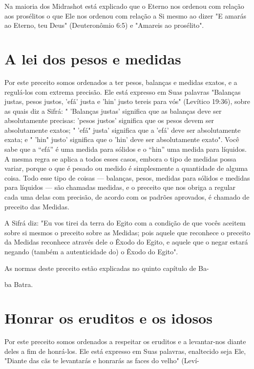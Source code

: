 Na maioria dos Midrashot está explicado que o Eterno nos ordenou com
relação aos prosélitos o que Ele nos ordenou com relação a Si mesmo ao
dizer "E amarás ao Eterno, teu Deus" (Deuteronômio 6:5) e "Amareis ao
prosélito".

\section{A lei dos pesos e medidas}

Por este preceito somos ordenados a ter pesos, balanças e medidas
exatos, e a regulá-los com extrema precisão. Ele está expresso em Suas
palavras "Balanças justas, pesos justos, 'efá' justa e 'hin' justo
tereis para vós" (Levítico 19:36), sobre as quais diz a Sifrá: "
'Balanças justas' significa que as balanças deve ser absolutamente
precisas: 'pesos justos' significa que os pesos devem ser absolutamente
exatos; " 'efá" justa' significa que a 'efá' deve ser absoluta­mente
exata; e " 'hin" justo' significa que o 'hin' deve ser absolutamente
exa­to". Você sabe que a ``efá'' é uma medida para sólidos e o ``hin'' uma
medida para líquidos. A mesma regra se aplica a todos esses casos,
embora o tipo de medidas possa variar, porque o que é pesado ou medido é
simplesmente a quan­tidade de alguma coisa. Todo esse tipo de coisas ---
balanças, pesos, medidas para sólidos e medidas para líquidos --- são
chamadas medidas, e o preceito que nos obriga a regular cada uma delas
com precisão, de acordo com os pa­drões aprovados, é chamado de preceito
das Medidas.

A Sifrá diz: "Eu vos tirei da terra do Egito com a condição de que vocês
aceitem sobre si mesmos o preceito sobre as Medidas; pois aquele que
reconhece o preceito da Medidas reconhece através dele o Êxodo do Egito,
e aquele que o negar estará negando (também a autenticidade do) o Êxodo
do Egito".


As normas deste preceito estão explicadas no quinto capítulo de Ba-


ba Batra.

\section{Honrar os eruditos e os idosos}

Por este preceito somos ordenados a respeitar os eruditos e a
levantar-nos diante deles a fim de honrá-los. Ele está expresso em Suas
palavras, enalte­cido seja Ele, "Diante das cãs te levantarás e honrarás
as faces do velho" (Leví-


